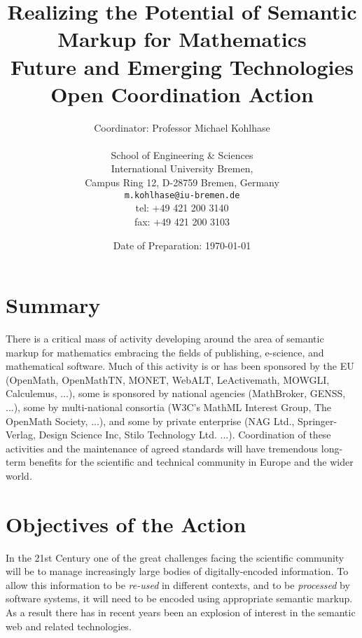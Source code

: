 \documentclass[draft]{artikel3}
\begin{document}
\title{Realizing the Potential of Semantic  Markup for Mathematics\\
  \normalfont\large Future and Emerging Technologies Open Coordination
  Action}
\date{Date of Preparation: \today} 
\author{\normalfont\large  Coordinator: Professor Michael Kohlhase\\
  \parbox[t]{.5\textwidth}{
    \normalfont\normalsize School of Engineering \& Sciences\\
    \normalfont\normalsize International University Bremen, \\
    \normalfont\normalsize Campus Ring 12, D-28759 Bremen, Germany}
\hfill
 \parbox[t]{.5\textwidth}{\raggedleft
  \normalfont\normalsize \texttt{m.kohlhase@iu-bremen.de}\\
\normalfont\normalsize tel: +49 421 200 3140\\
\normalfont\normalsize fax: +49 421 200 3103}
}


\titlepage 

\maketitle
\showednotestrue


\section{Summary}

There is a critical mass of activity developing around the area of
semantic markup for mathematics embracing the fields of publishing,
e-science, and mathematical software.  Much of this activity is or has
been sponsored by the EU (OpenMath, OpenMathTN, MONET, WebALT,
LeActivemath, MOWGLI, Calculemus, ...), some is sponsored by national
agencies (MathBroker, GENSS, ...), some by multi-national consortia
(W3C's MathML Interest Group, The OpenMath Society, ...), and some by
private enterprise (NAG Ltd., Springer-Verlag, Design Science Inc,
Stilo Technology Ltd. ...).  Coordination of these activities and the
maintenance of agreed standards will have tremendous long-term
benefits for the scientific and technical community in Europe and the
wider world.


\section{Objectives of the Action}

In the 21st Century one of the great challenges facing the scientific
community will be to manage increasingly large bodies of
digitally-encoded information.  To allow this information to be
\emph{re-used} in different contexts, and to be \emph{processed} by
software systems,
it will need to be encoded using appropriate
semantic markup.  As a result there has in recent years been an
explosion of interest in the semantic web and related technologies.
\end{document}
